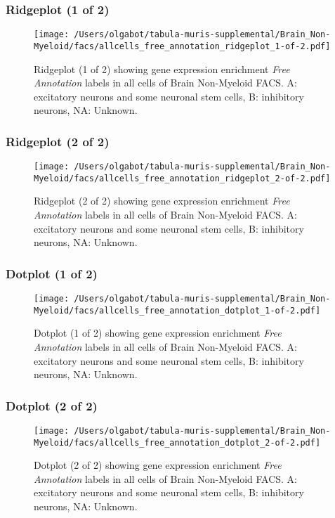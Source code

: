 \clearpage

\subsubsection{Ridgeplot (1 of 2)}
\begin{figure}[h]
\centering
\texttt{[image: /Users/olgabot/tabula-muris-supplemental/Brain\_Non-Myeloid/facs/allcells\_free\_annotation\_ridgeplot\_1-of-2.pdf]}

\caption{ Ridgeplot (1 of 2)  showing gene expression enrichment \emph{Free Annotation} labels in all cells of Brain Non-Myeloid FACS. A: excitatory neurons and some neuronal stem cells, B: inhibitory neurons, NA: Unknown.}
\end{figure}


\clearpage

\subsubsection{Ridgeplot (2 of 2)}
\begin{figure}[h]
\centering
\texttt{[image: /Users/olgabot/tabula-muris-supplemental/Brain\_Non-Myeloid/facs/allcells\_free\_annotation\_ridgeplot\_2-of-2.pdf]}

\caption{ Ridgeplot (2 of 2)  showing gene expression enrichment \emph{Free Annotation} labels in all cells of Brain Non-Myeloid FACS. A: excitatory neurons and some neuronal stem cells, B: inhibitory neurons, NA: Unknown.}
\end{figure}


\clearpage

\subsubsection{Dotplot (1 of 2)}
\begin{figure}[h]
\centering
\texttt{[image: /Users/olgabot/tabula-muris-supplemental/Brain\_Non-Myeloid/facs/allcells\_free\_annotation\_dotplot\_1-of-2.pdf]}

\caption{ Dotplot (1 of 2)  showing gene expression enrichment \emph{Free Annotation} labels in all cells of Brain Non-Myeloid FACS. A: excitatory neurons and some neuronal stem cells, B: inhibitory neurons, NA: Unknown.}
\end{figure}


\clearpage

\subsubsection{Dotplot (2 of 2)}
\begin{figure}[h]
\centering
\texttt{[image: /Users/olgabot/tabula-muris-supplemental/Brain\_Non-Myeloid/facs/allcells\_free\_annotation\_dotplot\_2-of-2.pdf]}

\caption{ Dotplot (2 of 2)  showing gene expression enrichment \emph{Free Annotation} labels in all cells of Brain Non-Myeloid FACS. A: excitatory neurons and some neuronal stem cells, B: inhibitory neurons, NA: Unknown.}
\end{figure}


